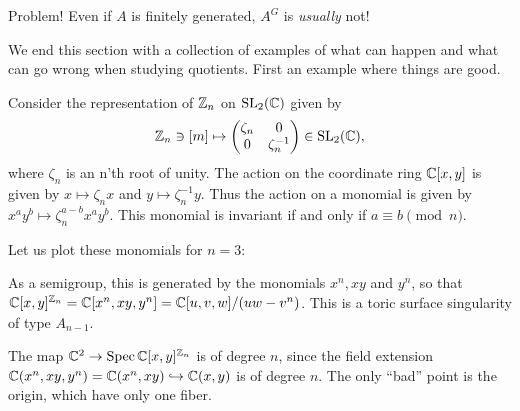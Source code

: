 \documentclass[11pt, english]{article}
\begin{document}
Problem! Even if $A$ is finitely generated, $A^G$ is \emph{usually} not!

We end this section with a collection of examples of what can happen and what can go wrong when studying quotients. First an example where things are good.

\begin{example}
Consider the representation of $\mathbb{Z}_n$ on $\operatorname{SL}_2(\mathbb{C})$ given by
$$
\mathbb{Z}_n \ni [m] \mapsto
\begin{pmatrix}
  \zeta_n & 0 \\ 0 & \zeta_n^{-1}
\end{pmatrix} \in \operatorname{SL}_2(\mathbb{C}),
$$
where $\zeta_n$ is an n'th root of unity. The action on the coordinate ring $\mathbb{C}[x,y]$ is given by $x \mapsto \zeta_n x$ and $y \mapsto \zeta_n^{-1}y$. Thus the action on a monomial is given by $x^ay^b \mapsto \zeta_n^{a-b}x^a y^b$. This monomial is invariant if and only if $a \equiv b \pmod{n}$.

Let us plot these monomials for $n=3$:
\begin{center}
\end{center}

As a semigroup, this is generated by the monomials $x^n,xy$ and $y^n$, so that $\mathbb{C}[x,y]^{\mathbb{Z}_n}=\mathbb{C}[x^n,xy,y^n]=\mathbb{C}[u,v,w]/(uw-v^n)$. This is a toric surface singularity of type $A_{n-1}$.

The  map $\mathbb{C}^2 \to \operatorname{Spec} \mathbb{C}[x,y]^{\mathbb{Z}_n}$ is of degree $n$, since the field extension $\mathbb{C}(x^n,xy,y^n)=\mathbb{C}(x^n,xy) \hookrightarrow \mathbb{C}(x,y)$ is of degree $n$. The only ``bad'' point is the origin, which have only one fiber.
\end{example}
\end{document}
